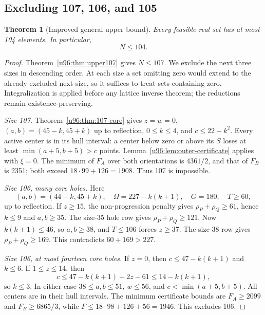 \documentclass[11pt,a4paper]{article}
\newtheorem{theorem}{Theorem}[section]
\theoremstyle{remark}
\begin{document}
\subsection{Excluding 107, 106, and 105}
\begin{theorem}[Improved general upper bound]\label{u96:thm:upper104}
Every feasible real set has at most 104 elements. In particular,
\[
 \boxed{N\leq104.}
\]
\end{theorem}
\begin{proof}
Theorem~\ref{u96:thm:upper107} gives $N\leq107$. We exclude the next
three sizes in descending order. At each size a set omitting zero would
extend to the already excluded next size, so it suffices to treat sets
containing zero. Integralization is applied before any lattice inverse
theorem; the reductions remain existence-preserving.

\emph{Size 107.} Theorem~\ref{u96:thm:107-core} gives $z=w=0$,
$(a,b)=(45-k,45+k)$ up to reflection, $0\leq k\leq4$, and
$c\leq22-k^2$. Every active center is in its hull interval: a center below
zero or above its $S$ loses at least $\min(a+5,b+5)>c$ points.
Lemma~\ref{u96:lem:outer-certificate} applies with $\xi=0$.
The minimum of $F_A$ over both orientations is $4361/2$, and that of
$F_B$ is 2351; both exceed $18\cdot99+126=1908$.
Thus 107 is impossible.

\emph{Size 106, many core holes.} Here
\[
 (a,b)=(44-k,45+k),\quad
 \Omega=227-k(k+1),\quad G=180,\quad T\geq60,
\]
up to reflection. If $z\geq15$, the non-progression penalty gives
$\rho_P+\rho_Q\geq61$, hence $k\leq9$ and $a,b\geq35$.
The size-35 hole row gives $\rho_P+\rho_Q\geq121$.
Now $k(k+1)\leq46$, so $a,b\geq38$, and
$T\leq106$ forces $z\geq37$. The size-38 row gives
$\rho_P+\rho_Q\geq169$. This contradicts $60+169>227$.

\emph{Size 106, at most fourteen core holes.} If $z=0$, then
$c\leq47-k(k+1)$ and $k\leq6$.
If $1\leq z\leq14$, then
\[
 c\leq47-k(k+1)+2z-61\leq14-k(k+1),
\]
so $k\leq3$. In either case $38\leq a,b\leq51$, $w\leq56$, and
$c<\min(a+5,b+5)$. All centers are in their hull intervals.
The minimum certificate bounds are $F_A\geq2099$ and
$F_B\geq6865/3$, while
$F\leq18\cdot98+126+56=1946$. This excludes 106.


\end{proof}
\end{document}
